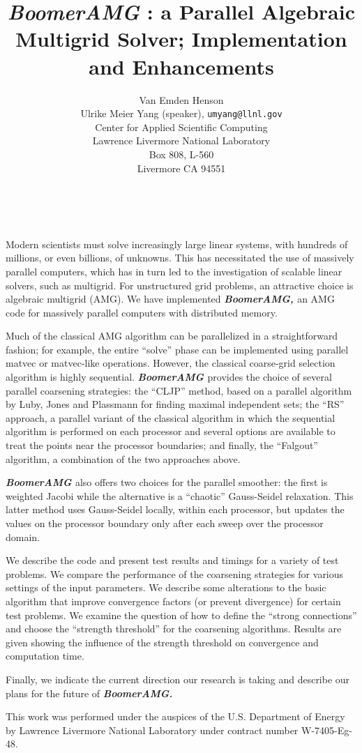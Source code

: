 \documentclass[11pt]{article}
\date{ ~ \hspace{-4mm}}
\title{{\em  BoomerAMG } : a Parallel Algebraic Multigrid Solver; Implementation and  Enhancements  }
\author{Van Emden Henson \\ Ulrike Meier Yang (speaker), {\tt umyang@llnl.gov} \\ Center for Applied Scientific Computing  \\  Lawrence Livermore National Laboratory  \\  Box 808, L-560  \\  Livermore CA 94551}
\begin{document}
\maketitle
\thispagestyle{empty}





 



Modern scientists must solve increasingly large linear systems, with
hundreds of millions, or even billions, of unknowns. This has
necessitated the use of massively parallel computers, which has in
turn led to the investigation of scalable linear solvers, such as
multigrid. For unstructured grid problems, an attractive choice is
algebraic multigrid (AMG). We have implemented
{\bf 
{\em 
BoomerAMG,
}
}
an AMG code for massively parallel computers
with distributed memory.




Much of the classical AMG algorithm can be parallelized in a
straightforward fashion; for example, the entire ``solve'' phase can be
implemented using parallel matvec or matvec-like operations. However,
the classical coarse-grid selection algorithm is highly
sequential.
{\bf 
{\em 
BoomerAMG
}
}
provides the choice of several
parallel coarsening strategies: the ``CLJP'' method, based on a parallel
algorithm by Luby, Jones and Plassmann for finding maximal independent
sets; the ``RS'' approach, a parallel variant of the classical algorithm
in which the sequential algorithm is performed on each processor and
several options are available to treat the points near the processor
boundaries; and finally, the ``Falgout'' algorithm, a combination of the
two approaches above.




{\bf 
{\em 
BoomerAMG
}
}
also offers two choices for the parallel
smoother: the first is weighted Jacobi while the alternative is a
``chaotic'' Gauss-Seidel relaxation. This latter method uses
Gauss-Seidel locally, within each processor, but updates the values on
the processor boundary only after each sweep over the processor
domain.




We describe the code and present test results and timings for a
variety of test problems. We compare the performance of the coarsening
strategies for various settings of the input parameters. We describe
some alterations to the basic algorithm that improve convergence
factors (or prevent divergence) for certain test problems. We examine
the question of how to define the ``strong connections'' and choose the
``strength threshold'' for the coarsening algorithms. Results are given
showing the influence of the strength threshold on convergence and
computation time.  




Finally, we indicate the current direction our research is taking and
describe our plans for the future of
{\bf 
{\em 
BoomerAMG.
}
}




This work was performed under the auspices of the U.S. Department of
Energy by Lawrence Livermore National Laboratory under contract number
W-7405-Eg-48.
\end{document}

